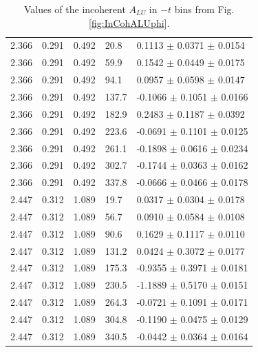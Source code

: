 \documentclass[aps,prc,preprint,superscriptaddress]{revtex4}
\begin{document}
\begin{table}[!h]
\begin{center}
\begin{tabular}{||l|l|l|l|l||}
  2.366 & 0.291 & 0.492  &   20.8  &  0.1113  $\pm$ 0.0371  $\pm$ 0.0154 \\
  2.366 & 0.291 & 0.492  &   59.9  &  0.1542  $\pm$ 0.0449  $\pm$ 0.0175 \\
  2.366 & 0.291 & 0.492  &   94.1  &  0.0957  $\pm$ 0.0598  $\pm$ 0.0147 \\
  2.366 & 0.291 & 0.492  &  137.7  & -0.1066  $\pm$ 0.1051  $\pm$ 0.0166 \\
  2.366 & 0.291 & 0.492  &  182.9  &  0.2483  $\pm$ 0.1187  $\pm$ 0.0392 \\
  2.366 & 0.291 & 0.492  &  223.6  & -0.0691  $\pm$ 0.1101  $\pm$ 0.0125 \\
  2.366 & 0.291 & 0.492  &  261.1  & -0.1898  $\pm$ 0.0616  $\pm$ 0.0234 \\
  2.366 & 0.291 & 0.492  &  302.7  & -0.1744  $\pm$ 0.0363  $\pm$ 0.0162 \\
  2.366 & 0.291 & 0.492  &  337.8  & -0.0666  $\pm$ 0.0466  $\pm$ 0.0178 \\
  \hline                                                              
                                                                           
  2.447 & 0.312 & 1.089  &  19.7   & 0.0317   $\pm$ 0.0304  $\pm$ 0.0178 \\
  2.447 & 0.312 & 1.089  &  56.7   & 0.0910   $\pm$ 0.0584  $\pm$ 0.0108 \\
  2.447 & 0.312 & 1.089  &  90.6   & 0.1629   $\pm$ 0.1117  $\pm$ 0.0110 \\
  2.447 & 0.312 & 1.089  & 131.2   & 0.0424   $\pm$ 0.3072  $\pm$ 0.0177 \\
  2.447 & 0.312 & 1.089  & 175.3   &-0.9355   $\pm$ 0.3971  $\pm$ 0.0181 \\
  2.447 & 0.312 & 1.089  & 230.5   &-1.1889   $\pm$ 0.5170  $\pm$ 0.0151 \\
  2.447 & 0.312 & 1.089  & 264.3   &-0.0721   $\pm$ 0.1091  $\pm$ 0.0171 \\
  2.447 & 0.312 & 1.089  & 304.8   &-0.1190   $\pm$ 0.0475  $\pm$ 0.0129 \\
  2.447 & 0.312 & 1.089  & 340.5   &-0.0442   $\pm$ 0.0364  $\pm$ 0.0164 \\

 \hline
 \hline
 \end{tabular}
 \caption{Values of the incoherent $A_{LU}$ in $-t$ bins from Fig. \ref{fig:InCohALUphi}.}
 \label{table:InCoh_t_BSA}
 \end{center}
\end{table}


\end{document}
